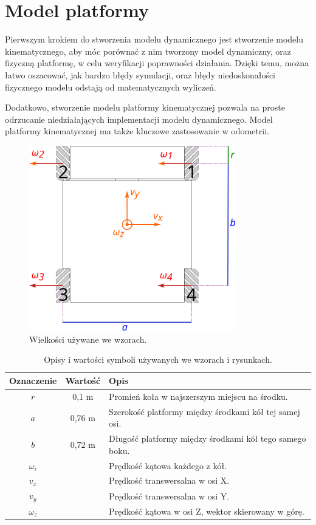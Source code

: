 \chapter{Model platformy}
\label{sec:model}
Pierwszym krokiem do stworzenia modelu dynamicznego jest stworzenie modelu kinematycznego, aby móc porównać z nim tworzony model dynamiczny, oraz fizyczną platformę,
w celu weryfikacji poprawności działania.
Dzięki temu, można łatwo oszacować, jak bardzo błędy symulacji, oraz błędy niedoskonałości fizycznego modelu odstają od matematycznych wyliczeń.

Dodatkowo, stworzenie modelu platformy kinematycznej pozwala na proste odrzucanie niedziałających implementacji modelu dynamicznego.
Model platformy kinematycznej ma także kluczowe zastosowanie w odometrii.

\begin{figure}[H]
\centering
 \includegraphics[width=0.8\textwidth]{graphics/base_dims.pdf}
\caption{Wielkości używane we wzorach.}
\label{fig:base_dims}
\end{figure} 

\begin{table}
\centering
\begin{tabular}{c c l}
Oznaczenie & Wartość & Opis \\
\hline
$r$ & 0,1 m & Promień koła w najszerszym miejscu na środku. \\
$a$ & 0,76 m & Szerokość platformy między środkami kół tej samej osi. \\
$b$ & 0,72 m & Długość platformy między środkami kół tego samego boku. \\
$\omega_i$ & & Prędkość kątowa każdego z kół. \\
$v_x$ & & Prędkość transwersalna w osi X. \\
$v_y$ & & Prędkość transwersalna w osi Y. \\
$\omega_z$ & & Prędkość kątowa w osi Z, wektor skierowany w górę. \\
\end{tabular}
\caption{Opisy i wartości symboli używanych we wzorach i rysunkach.}
\label{tab:dims}
\end{table}

